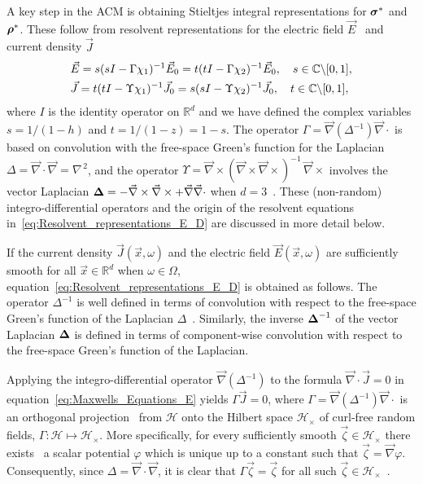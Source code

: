 \documentclass{cmslatex}
\newcommand\bsig{\mbox{\boldmath${\sigma}$}}
\newcommand\brho{\mbox{\boldmath${\rho}$}}
\newcommand\bDelta{\mbox{\boldmath${\Delta}$}}
\begin{document}
A key step in the ACM is
obtaining Stieltjes integral representations for $\bsig^*$ and
$\brho^*$. These follow from resolvent representations for the
electric field $\vec{E}$~\cite{Golden:CMP-473} and current density
$\vec{J}$~\cite{Murphy:JMP:063506}
%
\begin{align}\label{eq:Resolvent_representations_E_D}
  &\vec{E}=s(sI-\Gamma\chi_1)^{-1}\vec{E}_0=t(tI-\Gamma\chi_2)^{-1}\vec{E}_0 ,
  \quad
   s\in\mathbb{C}\backslash[0,1],\\
  &\vec{J}=t(tI-\Upsilon\chi_1)^{-1}\vec{J}_0=s(sI-\Upsilon\chi_2)^{-1}\vec{J}_0 ,
  \quad
   t\in\mathbb{C}\backslash[0,1],\notag 
\end{align}
%
where $I$ is the identity operator on $\mathbb{R}^d$ and we have
defined the complex variables $s=1/(1-h)$ and $t=1/(1-z)=1-s$. 
The operator $\Gamma=\vec{\nabla}(\Delta^{-1})\vec{\nabla}\cdot$ is based on
convolution with the free-space Green's function for the Laplacian
$\Delta=\vec{\nabla}\cdot\vec{\nabla}=\nabla^{\,2}$, and the operator
$\Upsilon=\vec{\nabla}\times(\vec{\nabla}\times\vec{\nabla}\times)^{-1}\,\vec{\nabla}\times$ involves the vector
Laplacian $\bDelta=- \vec{\nabla}\times\vec{\nabla}\times + \vec{\nabla}\vec{\nabla}\cdot $ when
$d=3$~\cite{Golden:CMP-473,Murphy:JMP:063506}. These (non-random) 
integro-differential operators and the origin of the resolvent
equations in~\eqref{eq:Resolvent_representations_E_D} are discussed in
more detail below.       



If the current density $\vec{J}(\vec{x},\omega)$ and the electric
field $\vec{E}(\vec{x},\omega)$ are sufficiently smooth for all
$\vec{x}\in\mathbb{R}^d$ when $\omega\in\Omega$,
equation~\eqref{eq:Resolvent_representations_E_D} is obtained as 
follows. The operator $\Delta^{-1}$ is
well defined in terms of convolution with respect to the free-space
Green's function of the Laplacian
$\Delta$~\cite{Golden:CMP-473,Folland:95,Stakgold:BVP:2000}. Similarly, the
inverse $\bDelta^{-1}$ of the vector Laplacian $\bDelta$ is defined in
terms of component-wise convolution with respect to the free-space
Green's function of the Laplacian.


Applying the integro-differential
operator $\vec{\nabla}(\Delta^{-1})$ to the
formula $\vec{\nabla}\cdot\vec{J}=0$ in
equation~\eqref{eq:Maxwells_Equations_E} yields $\Gamma\vec{J}=0$, where 
$\Gamma=\vec{\nabla}(\Delta^{-1})\vec{\nabla}\cdot$ is an orthogonal
projection~\cite{Golden:CMP-473} from $\mathscr{H}$ onto the Hilbert
space $\mathscr{H}_\times$ of curl-free random fields,
$\Gamma:\mathscr{H}\mapsto\mathscr{H}_\times$. More specifically, for every
sufficiently smooth $\vec{\zeta}\in\mathscr{H}_\times$ there
exists~\cite{Jackson-1999} a scalar potential $\varphi$ which is unique up
to a  
constant such that $\vec{\zeta}=\vec{\nabla}\varphi$. Consequently, since
$\Delta=\vec{\nabla}\cdot\vec{\nabla}$, it is clear that $\Gamma\vec{\zeta}=\vec{\zeta}$ for all such
$\vec{\zeta}\in\mathscr{H}_\times$~\cite{Folland:95,Stakgold:BVP:2000}.   
\end{document}
